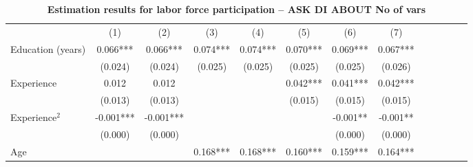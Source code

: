 \begin{center}
\begin{table}[th]
\caption{\textbf{Estimation results for labor force participation -- ASK DI ABOUT No of vars}} %
\label{tb:ProbitEstRes}
{\footnotesize 
\begin{tabular}{lcccccccccccc}
\hline
\hline
\multicolumn{1}{c}{} &
  \multicolumn{1}{c}{(1)} &
  \multicolumn{1}{c}{(2)} &
  \multicolumn{1}{c}{(3)} &
  \multicolumn{1}{c}{(4)} &
  \multicolumn{1}{c}{(5)} &
  \multicolumn{1}{c}{(6)} &
  \multicolumn{1}{c}{(7)} \\
\cline{1-8}
\multicolumn{1}{l}{Education (years)} &
  \multicolumn{1}{c}{0.066***} &
  \multicolumn{1}{c}{0.066***} &
  \multicolumn{1}{c}{0.074***} &
  \multicolumn{1}{c}{0.074***} &
  \multicolumn{1}{c}{0.070***} &
  \multicolumn{1}{c}{0.069***} &
  \multicolumn{1}{c}{0.067***} \\
\multicolumn{1}{l}{} &
  \multicolumn{1}{c}{(0.024)} &
  \multicolumn{1}{c}{(0.024)} &
  \multicolumn{1}{c}{(0.025)} &
  \multicolumn{1}{c}{(0.025)} &
  \multicolumn{1}{c}{(0.025)} &
  \multicolumn{1}{c}{(0.025)} &
  \multicolumn{1}{c}{(0.026)} \\
\multicolumn{1}{l}{Experience} &
  \multicolumn{1}{c}{0.012} &
  \multicolumn{1}{c}{0.012} &
  \multicolumn{1}{c}{} &
  \multicolumn{1}{c}{} &
  \multicolumn{1}{c}{0.042***} &
  \multicolumn{1}{c}{0.041***} &
  \multicolumn{1}{c}{0.042***} \\
\multicolumn{1}{l}{} &
  \multicolumn{1}{c}{(0.013)} &
  \multicolumn{1}{c}{(0.013)} &
  \multicolumn{1}{c}{} &
  \multicolumn{1}{c}{} &
  \multicolumn{1}{c}{(0.015)} &
  \multicolumn{1}{c}{(0.015)} &
  \multicolumn{1}{c}{(0.015)} \\
\multicolumn{1}{l}{Experience$^2$} &
  \multicolumn{1}{c}{-0.001***} &
  \multicolumn{1}{c}{-0.001***} &
  \multicolumn{1}{c}{} &
  \multicolumn{1}{c}{} &
  \multicolumn{1}{c}{} &
  \multicolumn{1}{c}{-0.001**} &
  \multicolumn{1}{c}{-0.001**} \\
\multicolumn{1}{l}{} &
  \multicolumn{1}{c}{(0.000)} &
  \multicolumn{1}{c}{(0.000)} &
  \multicolumn{1}{c}{} &
  \multicolumn{1}{c}{} &
  \multicolumn{1}{c}{} &
  \multicolumn{1}{c}{(0.000)} &
  \multicolumn{1}{c}{(0.000)} \\
\multicolumn{1}{l}{Age} &
  \multicolumn{1}{c}{} &
  \multicolumn{1}{c}{} &
  \multicolumn{1}{c}{0.168***} &
  \multicolumn{1}{c}{0.168***} &
  \multicolumn{1}{c}{0.160***} &
  \multicolumn{1}{c}{0.159***} &
  \multicolumn{1}{c}{0.164***} \\

\end{tabular}}
\end{table}
\end{center}
